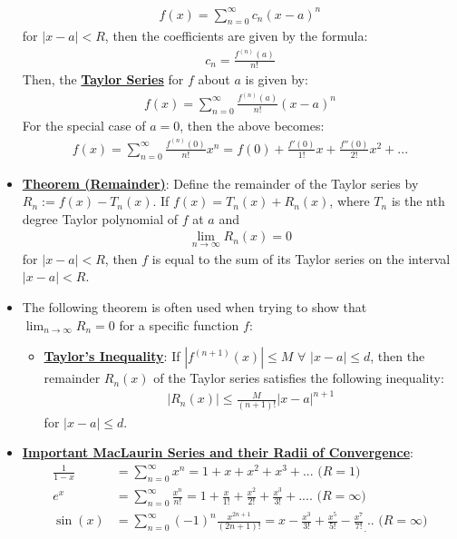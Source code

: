 \documentclass[11pt]{article}
\newcommand{\dfn}[1]{\underline{\textbf{#1}}}
\begin{document}
\begin{itemize}[noitemsep]
	\begin{align}
		f(x) = \sum_{n=0}^\infty c_n (x-a)^n 	
	\end{align}
	for $|x-a|<R$, then the coefficients are given by the formula: 
	\begin{align}
		c_n = \frac{f^{(n)}(a)}{n!	}	
	\end{align}
	Then, the \dfn{Taylor Series} for $f$ about $a$ is given by: 
	\begin{align}
		f(x) = \sum_{n=0}^\infty \frac{f^{(n)} (a)}{n!} (x-a)^n	
	\end{align}
	For the special case of $a=0$, then the above becomes: 
	\begin{align}
		f(x) = \sum_{n=0}^\infty \frac{f^{(n)} (0)}{n!}x^n = f(0) + \frac{f'(0)}{1!} x + \frac{f''(0)}{2!} x^2 + ... 	
	\end{align}
	\item \dfn{Theorem (Remainder)}: Define the remainder of the Taylor series by $R_n := f(x) - T_n(x)$. If $f(x) = T_n(x) + R_n(x)$, where $T_n$ is the nth degree Taylor polynomial of $f$ at $a$ and
	\begin{align}
		\lim_{n \rightarrow \infty} R_n(x) = 0 	
	\end{align}
	for $|x-a| < R$, then $f$ is equal to the sum of its Taylor series on the interval $|x-a|<R $.
	\item The following theorem is often used when trying to show that $\lim_{n \rightarrow \infty} R_n =0$ for a specific function $f$: 
	\begin{itemize}[noitemsep]
		\item \dfn{Taylor's Inequality}: If $|f^{(n+1)}(x)| \leq M$ $\forall $ $|x-a| \leq d$, then the remainder $R_n(x)$ of the Taylor series satisfies the following inequality: 
		\begin{align}
			|R_n(x) | \leq \frac{M}{(n+1)!}	|x-a|^{n+1} 
		\end{align}
		for $|x-a| \leq d$. 
	\end{itemize}
	\item \dfn{Important MacLaurin Series and their Radii of Convergence}: 
	\begin{align}
		\frac{1}{1-x} & = \sum_{n=0}^\infty x^n = 1 + x + x^2 + x^3 + ... \text{ ($R=1$) } \\
		e^x & = \sum_{n=0}^\infty \frac{x^n}{n!} = 1 + \frac{x}{1!} + \frac{x^2}{2!} + \frac{x^3}{3!} + .... \text{ ($R= \infty$)} \\
		\sin (x) &  = \sum_{n=0}^\infty (-1)^n \frac{x^{2n+1}}{(2n+1)!} = x - \frac{x^3}{3!} + \frac{x^5}{5!} - \frac{x^7}{7!} _ ... \text{ ($R =\infty$)} \\

\end{align}
\end{itemize}
\end{document}
